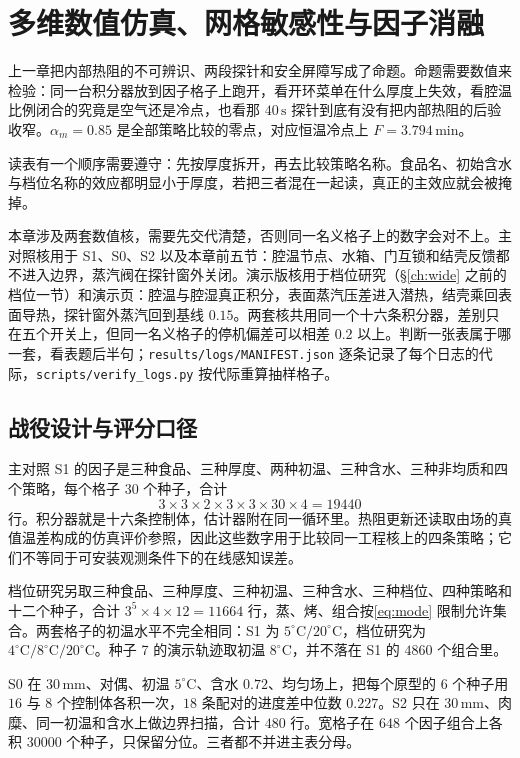 \chapter{多维数值仿真、网格敏感性与因子消融}
\label{ch:sim}
\label{ch:result}

上一章把内部热阻的不可辨识、两段探针和安全屏障写成了命题。命题需要数值来检验：同一台积分器放到因子格子上跑开，看开环菜单在什么厚度上失效，看腔温比例闭合的究竟是空气还是冷点，也看那 \(40\,\mathrm{s}\) 探针到底有没有把内部热阻的后验收窄。\(\alpha_m=0.85\) 是全部策略比较的零点，对应恒温冷点上 \(F=3.794\,\mathrm{min}\)。

读表有一个顺序需要遵守：先按厚度拆开，再去比较策略名称。食品名、初始含水与档位名称的效应都明显小于厚度，若把三者混在一起读，真正的主效应就会被掩掉。

本章涉及两套数值核，需要先交代清楚，否则同一名义格子上的数字会对不上。主对照核用于 S1、S0、S2 以及本章前五节：腔温节点、水箱、门互锁和结壳反馈都不进入边界，蒸汽阀在探针窗外关闭。演示版核用于档位研究（\S\ref{ch:wide} 之前的档位一节）和演示页：腔温与腔湿真正积分，表面蒸汽压差进入潜热，结壳乘回表面导热，探针窗外蒸汽回到基线 \(0.15\)。两套核共用同一个十六条积分器，差别只在五个开关上，但同一名义格子的停机偏差可以相差 \(0.2\) 以上。判断一张表属于哪一套，看表题后半句；\texttt{results/logs/MANIFEST.json} 逐条记录了每个日志的代际，\texttt{scripts/verify\_logs.py} 按代际重算抽样格子。

\section{战役设计与评分口径}

主对照 S1 的因子是三种食品、三种厚度、两种初温、三种含水、三种非均质和四个策略，每个格子 \(30\) 个种子，合计
\[
3\times 3\times 2\times 3\times 3\times 30\times 4=19440
\]
行。积分器就是十六条控制体，估计器附在同一循环里。热阻更新还读取由场的真值温差构成的仿真评价参照，因此这些数字用于比较同一工程核上的四条策略；它们不等同于可安装观测条件下的在线感知误差。

档位研究另取三种食品、三种厚度、三种初温、三种含水、三种档位、四种策略和十二个种子，合计 \(3^5\times 4\times 12=11664\) 行，蒸、烤、组合按\eqref{eq:mode} 限制允许集合。两套格子的初温水平不完全相同：S1 为 \(5^\circ\mathrm{C}/20^\circ\mathrm{C}\)，档位研究为 \(4^\circ\mathrm{C}/8^\circ\mathrm{C}/20^\circ\mathrm{C}\)。种子 7 的演示轨迹取初温 \(8^\circ\mathrm{C}\)，并不落在 S1 的 \(4860\) 个组合里。

S0 在 \(30\,\mathrm{mm}\)、对偶、初温 \(5^\circ\mathrm{C}\)、含水 \(0.72\)、均匀场上，把每个原型的 \(6\) 个种子用 \(16\) 与 \(8\) 个控制体各积一次，\(18\) 条配对的进度差中位数 \(0.227\)。S2 只在 \(30\,\mathrm{mm}\)、肉糜、同一初温和含水上做边界扫描，合计 \(480\) 行。宽格子在 \(648\) 个因子组合上各积 \(30000\) 个种子，只保留分位。三者都不并进主表分母。

